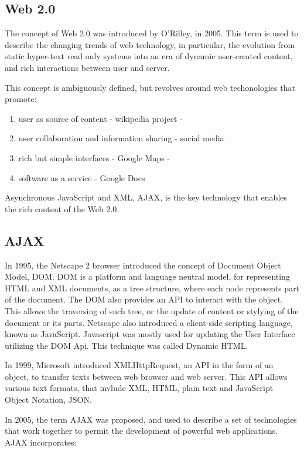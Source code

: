 \subsection{Web 2.0}
The concept of Web 2.0 was introduced by O'Rilley, in 2005. This term is used to describe
the changing trends of web technology, in particular, the evolution
from static hyper-text read only systems into an era of dynamic user-created content,
and rich interactions between user and server.

This concept is ambiguously defined, but revolves around web techonologies that promote:

\begin{enumerate}
\item user as source of content - wikipedia project -
\item user collaboration and information sharing - social media
\item rich but simple interfaces - Google Maps -
\item software as a service - Google Docs
\end{enumerate}

Asynchronous JavaScript and XML, AJAX,
is the key technology that enables the rich content of the Web 2.0.


\subsection{AJAX}

In 1995, the Netscape 2 browser introduced the concept of Document Object Model, DOM.
DOM is a platform and language neutral model, for representing HTML and XML documents,
as a tree structure, where each node represents part of the document.
The DOM also provides an API to interact with the object. This allows the traversing
of such tree, or the update of content or stylying of the document or its parts.
Netscape also introduced a client-side scripting language, known as JavaScript.
Javascript was mostly used for updating the User Interface utilizing the DOM Api.
This technique was called Dynamic HTML.

In 1999, Microsoft introduced XMLHttpRequest, an API in the form of an object,
to transfer texts between web browser and web server. This API allows
various text formats, that invlude XML, HTML, plain text and JavaScript Object Notation, JSON.

In 2005, the term AJAX was proposed, and used to describe a set of technologies
that work together to permit the development of powerful web applications.
AJAX incorporates:

